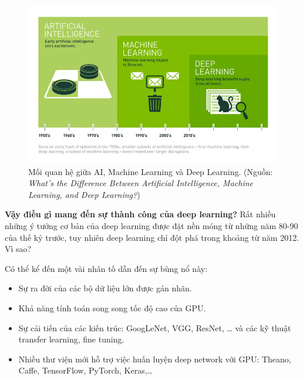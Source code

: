 \documentclass[a4paper, 12pt]{report}
\begin{document}
\begin{figure}[!h]
	\centering
	\includegraphics[width=1\linewidth]{Images/aimldl}
	\caption{Mối quan hệ giữa AI, Machine Learning và Deep Learning.
		(Nguồn: \textit{What’s the Difference Between Artificial Intelligence, Machine Learning, and Deep Learning?})}
	\label{fig:aimldl}
\end{figure}
\textbf{Vậy điều gì mang đến sự thành công của deep learning?} Rất nhiều những ý tưởng cơ bản của deep learning được đặt nền móng từ những năm 80-90 của thế kỷ trước, tuy nhiên deep learning chỉ đột phá trong khoảng từ năm 2012. Vì sao?\par
Có thể kể đến một vài nhân tố dẫn đến sự bùng nổ này:
\begin{itemize}
	\item Sự ra đời của các bộ dữ liệu lớn được gán nhãn.
	\item Khả năng tính toán song song tốc độ cao của GPU.
	\item Sự cải tiến của các kiến trúc: GoogLeNet, VGG, ResNet, … và các kỹ thuật transfer learning, fine tuning.
	\item Nhiều thư viện mới hỗ trợ việc huấn luyện deep network với GPU: Theano, Caffe, TensorFlow, PyTorch, Keras,\dots
\end{itemize}
\end{document}
